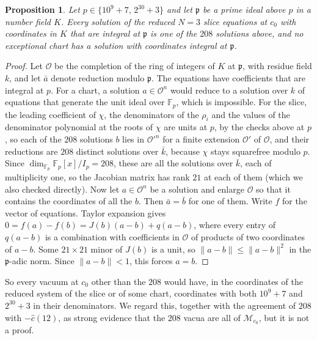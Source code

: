 \documentclass[11pt]{amsart}
\newtheorem{proposition}[theorem]{Proposition}
\theoremstyle{definition}
\newcommand{\cM}{\mathcal M}
\begin{document}
\begin{proposition}\label{prop:integral}
Let $p\in\{10^9+7,\,2^{30}+3\}$ and let $\mathfrak p$ be a prime ideal above $p$ in a number field $K$. Every solution of the reduced $N=3$ slice equations at $c_0$ with coordinates in $K$ that are integral at $\mathfrak p$ is one of the $208$ solutions above, and no exceptional chart has a solution with coordinates integral at $\mathfrak p$.
\end{proposition}

\begin{proof}
Let $\mathcal O$ be the completion of the ring of integers of $K$ at $\mathfrak p$, with residue field $k$, and let $\bar a$ denote reduction modulo $\mathfrak p$. The equations have coefficients that are integral at $p$. For a chart, a solution $a\in\mathcal O^n$ would reduce to a solution over $k$ of equations that generate the unit ideal over $\mathbb F_p$, which is impossible. For the slice, the leading coefficient of $\chi$, the denominators of the $\rho_i$ and the values of the denominator polynomial at the roots of $\chi$ are units at $p$, by the checks above at $p$, so each of the $208$ solutions $b$ lies in $\mathcal O'^n$ for a finite extension $\mathcal O'$ of $\mathcal O$, and their reductions are $208$ distinct solutions over $\bar k$, because $\chi$ stays squarefree modulo $p$. Since $\dim_{\mathbb F_p}\mathbb F_p[x]/I_p=208$, these are all the solutions over $\bar k$, each of multiplicity one, so the Jacobian matrix has rank $21$ at each of them (which we also checked directly). Now let $a\in\mathcal O^n$ be a solution and enlarge $\mathcal O$ so that it contains the coordinates of all the $b$. Then $\bar a=\bar b$ for one of them. Write $f$ for the vector of equations. Taylor expansion gives $0=f(a)-f(b)=J(b)(a-b)+q(a-b)$, where every entry of $q(a-b)$ is a combination with coefficients in $\mathcal O$ of products of two coordinates of $a-b$. Some $21\times21$ minor of $J(b)$ is a unit, so $\|a-b\|\le\|a-b\|^2$ in the $\mathfrak p$-adic norm. Since $\|a-b\|<1$, this forces $a=b$.
\end{proof}

So every vacuum at $c_0$ other than the $208$ would have, in the coordinates of the reduced system of the slice or of some chart, coordinates with both $10^9+7$ and $2^{30}+3$ in their denominators. We regard this, together with the agreement of $208$ with $-\hat c(12)$, as strong evidence that the $208$ vacua are all of $\cM_{c_0}$, but it is not a proof.
\end{document}
